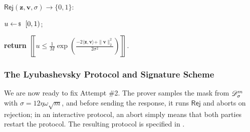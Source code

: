 \documentclass[../../book.tex]{subfiles}
\begin{document}
\begin{algoproto}[ht]
    \small
    \centering
    \begin{mdframed}[userdefinedwidth=0.75\linewidth, align=center,
                     linecolor=black, linewidth=1pt,
                     skipabove=10pt, skipbelow=10pt,
                     innerleftmargin=5pt, innerrightmargin=5pt]
        \colorbox{oc-blue-1}{$\mathsf{Rej}(\mathbf{z}, \mathbf{v}, \sigma) \to \{0,1\}$:}
        \begin{algoen}
            \item $u \leftarrowS [0,1)$;
            \item \textbf{return} $\left\llbracket u \leq \frac{1}{M}\exp\left(\frac{-2\langle \mathbf{z},\mathbf{v} \rangle + \|\mathbf{v}\|_2^2}{2\sigma^2}\right) \right\rrbracket$. 
        \end{algoen}
    \end{mdframed}
    \caption{Rejection sampling for a candidate $\mathbf{z} = \mathbf{y} + \mathbf{v}$ with $\mathbf{y} \leftarrowS \dgaussian^m_{\sigma}$. For $\sigma \geq 12\|\mathbf{v}\|_2$ and $M \approx \exp(1)$, accepted vectors $\mathbf{z}$ are within statistical distance $2^{-100}$ of $\dgaussian^m_{\sigma}$, \emph{independently of $\mathbf{v}$}.}
    \label{fig:rej}
\end{algoproto}

\subsubsection{The Lyubashevsky Protocol and Signature Scheme}

We are now ready to fix Attempt \#2.
The prover samples the mask from $\dgaussian^m_{\sigma}$ with $\sigma = 12\eta\omega\sqrt{m}$, and before sending the response, it runs $\mathsf{Rej}$ and aborts on rejection; in an interactive protocol, an abort simply means that both parties restart the protocol.
The resulting protocol is specified in .
\end{document}
